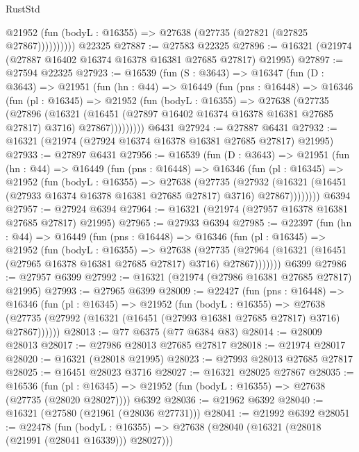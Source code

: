 \begin{lexlean}{RustStd}
\begin{coremodule}
              @21952 (fun (bodyL : @16355) => @27638 (@27735 (@27821 (@27825 @27867))))))))))
    @22325
@27887 := @27583 @22325
@27896 := @16321 (@21974 (@27887 @16402 @16374 @16378 @16381 @27685 @27817) @21995)
@27897 := @27594 @22325
@27923 := @16539
    (fun (S : @3643) =>
    @16347
      (fun (D : @3643) =>
      @21951
        (fun (hn : @44) =>
        @16449
          (fun (pns : @16448) =>
          @16346
            (fun (pl : @16345) =>
            @21952
              (fun (bodyL : @16355) =>
              @27638
                (@27735
                  (@27896
                    (@16321
                      (@16451 (@27897 @16402 @16374 @16378 @16381 @27685 @27817) @3716)
                      @27867)))))))))
    @6431
@27924 := @27887 @6431
@27932 := @16321 (@21974 (@27924 @16374 @16378 @16381 @27685 @27817) @21995)
@27933 := @27897 @6431
@27956 := @16539
    (fun (D : @3643) =>
    @21951
      (fun (hn : @44) =>
      @16449
        (fun (pns : @16448) =>
        @16346
          (fun (pl : @16345) =>
          @21952
            (fun (bodyL : @16355) =>
            @27638
              (@27735
                (@27932
                  (@16321 (@16451 (@27933 @16374 @16378 @16381 @27685 @27817) @3716) @27867))))))))
    @6394
@27957 := @27924 @6394
@27964 := @16321 (@21974 (@27957 @16378 @16381 @27685 @27817) @21995)
@27965 := @27933 @6394
@27985 := @22397
    (fun (hn : @44) =>
    @16449
      (fun (pns : @16448) =>
      @16346
        (fun (pl : @16345) =>
        @21952
          (fun (bodyL : @16355) =>
          @27638
            (@27735
              (@27964 (@16321 (@16451 (@27965 @16378 @16381 @27685 @27817) @3716) @27867)))))))
    @6399
@27986 := @27957 @6399
@27992 := @16321 (@21974 (@27986 @16381 @27685 @27817) @21995)
@27993 := @27965 @6399
@28009 := @22427
    (fun (pns : @16448) =>
    @16346
      (fun (pl : @16345) =>
      @21952
        (fun (bodyL : @16355) =>
        @27638 (@27735 (@27992 (@16321 (@16451 (@27993 @16381 @27685 @27817) @3716) @27867))))))
@28013 := @77 @6375 (@77 @6384 @83)
@28014 := @28009 @28013
@28017 := @27986 @28013 @27685 @27817
@28018 := @21974 @28017
@28020 := @16321 (@28018 @21995)
@28023 := @27993 @28013 @27685 @27817
@28025 := @16451 @28023 @3716
@28027 := @16321 @28025 @27867
@28035 := @16536
    (fun (pl : @16345) => @21952 (fun (bodyL : @16355) => @27638 (@27735 (@28020 @28027))))
    @6392
@28036 := @21962 @6392
@28040 := @16321 (@27580 (@21961 (@28036 @27731)))
@28041 := @21992 @6392
@28051 := @22478
    (fun (bodyL : @16355) => @27638 (@28040 (@16321 (@28018 (@21991 (@28041 @16339))) @28027)))

\end{coremodule}
\end{lexlean}
